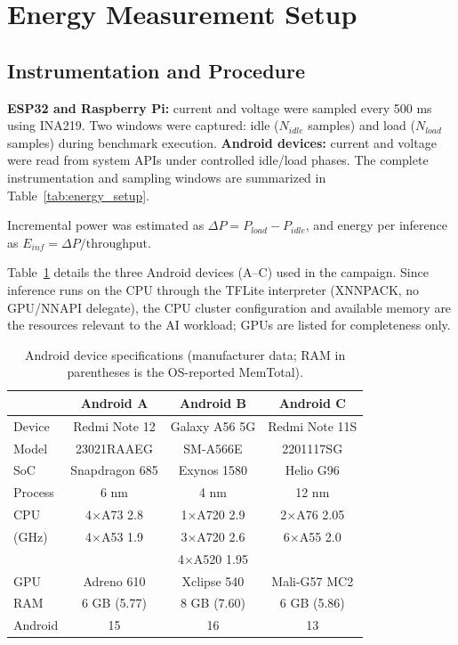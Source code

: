 \section{Energy Measurement Setup}

\subsection{Instrumentation and Procedure}
\textbf{ESP32 and Raspberry Pi:} current and voltage were sampled every 500 ms using INA219. Two windows were captured: idle ($N_{idle}$ samples) and load ($N_{load}$ samples) during benchmark execution.\newline
\textbf{Android devices:} current and voltage were read from system APIs under controlled idle/load phases.
The complete instrumentation and sampling windows are summarized in Table~\ref{tab:energy_setup}.

Incremental power was estimated as $\Delta P = P_{load} - P_{idle}$, and energy per inference as $E_{inf} = \Delta P / \text{throughput}$.

Table~\ref{tab:android_specs} details the three Android devices (A--C) used in the campaign. Since inference runs on the CPU through the TFLite interpreter (XNNPACK, no GPU/NNAPI delegate), the CPU cluster configuration and available memory are the resources relevant to the AI workload; GPUs are listed for completeness only.

\begin{table}[t]
\caption{Android device specifications (manufacturer data; RAM in parentheses is the OS-reported MemTotal).}
\label{tab:android_specs}
\centering
\scriptsize
\setlength{\tabcolsep}{3pt}
\begin{tabular}{lccc}
\toprule
 & Android A & Android B & Android C \\
\midrule
Device & Redmi Note 12 & Galaxy A56 5G & Redmi Note 11S \\
Model & 23021RAAEG & SM-A566E & 2201117SG \\
SoC & Snapdragon 685 & Exynos 1580 & Helio G96 \\
Process & 6 nm & 4 nm & 12 nm \\
CPU & 4$\times$A73 2.8 & 1$\times$A720 2.9 & 2$\times$A76 2.05 \\
(GHz) & 4$\times$A53 1.9 & 3$\times$A720 2.6 & 6$\times$A55 2.0 \\
 & & 4$\times$A520 1.95 & \\
GPU & Adreno 610 & Xclipse 540 & Mali-G57 MC2 \\
RAM & 6 GB (5.77) & 8 GB (7.60) & 6 GB (5.86) \\
Android & 15 & 16 & 13 \\
\bottomrule
\end{tabular}
\end{table}

